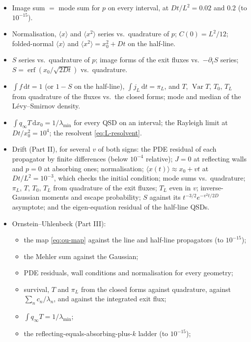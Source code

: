 \documentclass[11pt]{article}
\numberwithin{equation}{section}
\newcommand{\dd}{\mathrm{d}}
\newcommand{\avg}[1]{\langle #1\rangle}
\begin{document}
\begin{itemize}
  \item Image sum $=$ mode sum for $p$ on every interval, at $Dt/L^2=0.02$ and $0.2$ (to $10^{-15}$).
  \item Normalisation, $\avg x$ and $\avg{x^2}$ series vs.\ quadrature of $p$; $C(0)=L^2/12$; folded-normal
        $\avg x$ and $\avg{x^2}=x_0^2+Dt$ on the half-line.
  \item $S$ series vs.\ quadrature of $p$; image forms of the exit fluxes vs.\ $-\partial_tS$ series;
        $S=\operatorname{erf}(x_0/\sqrt{2Dt})$ vs.\ quadrature.
  \item $\int f\,\dd t=1$ (or $1-S$ on the half-line), $\int j_L\,\dd t=\pi_L$, and $T$,
        $\operatorname{Var}T$, $T_0$, $T_L$ from quadrature of the fluxes vs.\ the closed forms; mode and median
        of the L\'evy--Smirnov density.
  \item $\int q_\infty T\,\dd x_0=1/\lambda_{\min}$ for every QSD on an interval; the Rayleigh limit at
        $Dt/x_0^2=10^4$; the resolvent \cref{eq:L-resolvent}.
  \item Drift (Part II), for several $v$ of both signs: the PDE residual of each propagator by finite
        differences (below $10^{-4}$ relative); $J=0$ at reflecting walls and $p=0$ at absorbing ones;
        normalisation; $\avg{x(t)}\approx x_0+vt$ at $Dt/L^2=10^{-3}$, which checks the initial condition;
        mode sums vs.\ quadrature; $\pi_L$, $T$, $T_0$, $T_L$ from quadrature of the exit fluxes; $T_L$ even in
        $v$; inverse-Gaussian moments and escape probability; $S$ against its $t^{-3/2}e^{-v^2t/2D}$ asymptote;
        and the eigen-equation residual of the half-line QSDs.
  \item Ornstein--Uhlenbeck (Part III):
        \begin{itemize}
          \item the map \cref{eq:ou-map} against the line and half-line propagators (to $10^{-15}$);
          \item the Mehler sum against the Gaussian;
          \item PDE residuals, wall conditions and normalisation for every geometry;
          \item survival, $T$ and $\pi_L$ from the closed forms against quadrature, against
                $\sum_nc_n/\lambda_n$, and against the integrated exit flux;
          \item $\int q_\infty T=1/\lambda_{\min}$;
          \item the reflecting-equals-absorbing-plus-$k$ ladder (to $10^{-15}$);

\end{itemize}
\end{itemize}
\end{document}
